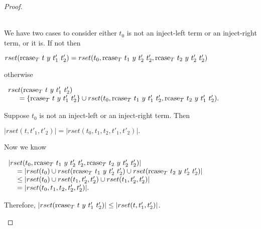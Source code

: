 \begin{proof}
\begin{itemize}
\begin{itemize}
    \ \\
    We have two cases to consider either $t_0$ is not an inject-left term or an inject-right term, or it is.
    If not then
    \begin{center}
      \begin{math}
        rset(\mbox{rcase}_{T}\ t\ y\ t'_1\ t'_2) =
        rset(t_0,\mbox{rcase}_{T}\ t_1\ y\ t'_2\ t'_2,\mbox{rcase}_{T}\ t_2\ y\ t'_2\ t'_2) 
      \end{math}
    \end{center}
    otherwise 
    \begin{center}
      \begin{math}
        \begin{array}{lll}
          rset(\mbox{rcase}_{T}\ t\ y\ t'_1\ t'_2) \\
          \text{\ \ \ \ } = \{\mbox{rcase}_{T}\ t\ y\ t'_1\ t'_2\} \cup
          rset(t_0,\mbox{rcase}_{T}\ t_1\ y\ t'_1\ t'_2,\mbox{rcase}_{T}\ t_2\ y\ t'_1\ t'_2).
        \end{array}
      \end{math}
    \end{center}
    Suppose $t_0$ is not an inject-left or an inject-right term.  Then
    \begin{center}
      \begin{math}
        |rset(t, t'_1, t'_2)| = |rset(t_0, t_1, t_2, t'_1, t'_2)|.
      \end{math}
    \end{center}
    Now we know 
    \begin{center}
      \begin{math}
        \begin{array}{ll}
          |rset(t_0,\mbox{rcase}_{T}\ t_1\ y\ t'_2\ t'_2,\mbox{rcase}_{T}\ t_2\ y\ t'_2\ t'_2)|\\
          \text{\ \ \ } = 
          |rset(t_0) \cup rset(\mbox{rcase}_{T}\ t_1\ y\ t'_2\ t'_2) \cup rset(\mbox{rcase}_{T}\ t_2\ y\ t'_2\ t'_2)|\\
          \text{\ \ \ } \leq  |rset(t_0) \cup rset(t_1,t'_2,t'_2) \cup rset(t_1,t'_2,t'_2)| \\
          \text{\ \ \ } =   |rset(t_0, t_1,t_2,t'_2,t'_2)|.
        \end{array}
      \end{math}
    \end{center}
    Therefore, $|rset(\mbox{rcase}_{T}\ t\ y\ t'_1\ t'_2)| \leq |rset(t, t'_1, t'_2)|$.
    

\end{itemize}
\end{itemize}
\end{proof}
